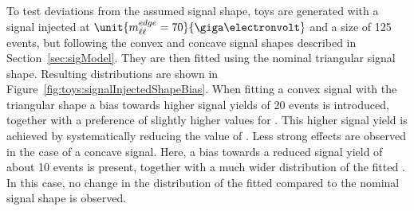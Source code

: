To test deviations from the assumed signal shape, toys are generated with a signal injected at $\unit{\mlledge = 70}{\giga\electronvolt}$ and a size of 125 events, but following the convex and concave signal shapes described in Section~\ref{sec:sigModel}. They are then fitted using the nominal triangular signal shape. Resulting distributions are shown in Figure~\ref{fig:toys:signalInjectedShapeBias}. When fitting a convex signal with the triangular shape a bias towards higher signal yields of 20 events is introduced, together with a preference of slightly higher values for \mlledge. This higher signal yield is achieved by systematically reducing the value of \Rsfof. Less strong effects are observed in the case of a concave signal. Here, a bias towards a reduced signal yield of about 10 events is present, together with a much wider distribution of the fitted \mlledge. In this case, no change in the distribution of the fitted \Rsfof compared to the nominal signal shape is observed. 

